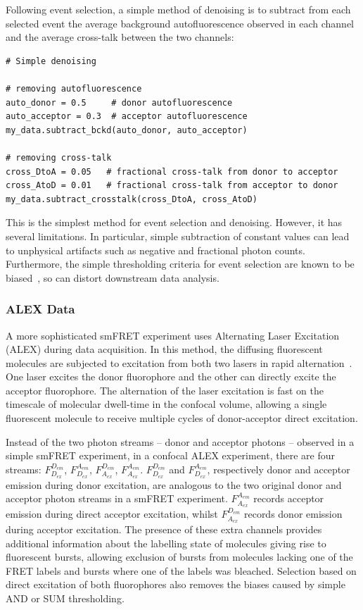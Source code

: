 \documentclass[10pt]{article}
\begin{document}
Following event selection, a simple method of denoising is to subtract from each selected event the average background autofluorescence observed in each channel and the average cross-talk between the two channels:

\begin{lstlisting}
# Simple denoising

# removing autofluorescence
auto_donor = 0.5     # donor autofluorescence
auto_acceptor = 0.3  # acceptor autofluorescence
my_data.subtract_bckd(auto_donor, auto_acceptor)

# removing cross-talk
cross_DtoA = 0.05   # fractional cross-talk from donor to acceptor
cross_AtoD = 0.01   # fractional cross-talk from acceptor to donor
my_data.subtract_crosstalk(cross_DtoA, cross_AtoD)
\end{lstlisting}

This is the simplest method for event selection and denoising. However, it has several limitations. In particular, simple subtraction of constant values can lead to unphysical artifacts such as negative and fractional photon counts. Furthermore, the simple thresholding criteria for event selection are known to be biased~\cite{nir06}, so can distort downstream data analysis. 

\subsubsection*{ALEX Data}
A more sophisticated smFRET experiment uses Alternating Laser Excitation (ALEX) during data acquisition. In this method, the diffusing fluorescent molecules are subjected to excitation from both two lasers in rapid alternation~\cite{kapanidis05}. One laser excites the donor fluorophore and the other can directly excite the acceptor fluorophore. The alternation of the laser excitation is fast on the timescale of molecular dwell-time in the confocal volume, allowing a single fluorescent molecule to receive multiple cycles of donor-acceptor direct excitation.

Instead of the two photon streams -- donor and acceptor photons -- observed in a simple smFRET experiment, in a confocal ALEX experiment, there are four streams: $F_{D_{ex}}^{D_{em}}$, $F_{D_{ex}}^{A_{em}}$, $F_{A_{ex}}^{D_{em}}$, $F_{A_{ex}}^{A_{em}}$. $F_{D_{ex}}^{D_{em}}$ and $F_{D_{ex}}^{A_{em}}$, respectively donor and acceptor emission during donor excitation, are analogous to the two original donor and acceptor photon streams in a smFRET experiment. $F_{A_{ex}}^{A_{em}}$ records acceptor emission during direct acceptor excitation, whilst $F_{A_{ex}}^{D_{em}}$ records donor emission during acceptor excitation. The presence of these extra channels provides additional information about the labelling state of molecules giving rise to fluorescent bursts, allowing exclusion of bursts from molecules lacking one of the FRET labels and bursts where one of the labels was bleached. Selection based on direct excitation of both fluorophores also removes the biases caused by simple AND or SUM thresholding. 
\end{document}
